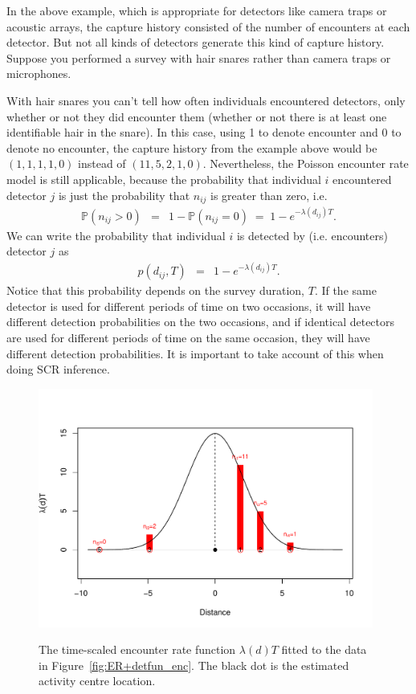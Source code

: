 \documentclass[graybox,envcountchap,sectrefs]{SpringerStyleFiles/styles/svmono}\usepackage[]{graphicx}\usepackage[]{color}
\newcommand{\be}{\begin{eqnarray}}
\newcommand{\ee}{\end{eqnarray}}
\begin{document}
In the above example, which is appropriate for detectors like camera traps or acoustic arrays, the capture history consisted of the number of encounters at each detector. But not all kinds of detectors generate this kind of capture history. Suppose  you performed a survey with hair snares rather than camera traps or microphones.

With hair snares you can't tell how often individuals encountered detectors, only whether or not they did encounter them (whether or not there is at least one identifiable hair in the snare). In this case, using 1 to denote encounter and 0 to denote no encounter, the capture history from the example above would be $(1,1,1,1,0)$ instead of $(11,5,2,1,0)$. Nevertheless, the Poisson encounter rate model is still applicable, because the probability that individual $i$ encountered detector $j$ is just the probability that $n_{ij}$ is greater than zero, i.e.
\be
\mathbb{P}(n_{ij}>0)&=&1-\mathbb{P}(n_{ij}=0)
\;=\;1-e^{-\lambda(d_{ij})T}. 
\ee
We can write the probability that individual $i$ is detected by (i.e. encounters) detector $j$ as 
\be
p(d_{ij},T)&=&1-e^{-\lambda(d_{ij})T}. 
\label{eq:ER+detfun.binaryp}
\ee
Notice that this probability depends on the survey duration, $T$. If the same detector is used for different periods of time on two occasions, it will have different detection probabilities on the two occasions, and if identical detectors are used for different periods of time on the same occasion, they will have different detection probabilities. It is important to take account of this when doing SCR inference.


\begin{figure}[ht]
\caption{\small The time-scaled encounter rate function $\lambda(d)T$ fitted to the data in Figure~\ref{fig:ER+detfun_enc}. The black dot is the estimated activity centre location.}
\centering
\vspace{-24pt}
\includegraphics[width=11cm]{keepfigure/EandN.pdf}
\label{fig:ER+detfun_EandN}
\end{figure}
\end{document}
